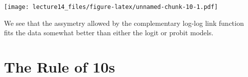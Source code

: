 \documentclass[
]{article}
\begin{document}
\texttt{[image: lecture14\_files/figure-latex/unnamed-chunk-10-1.pdf]}

We see that the assymetry allowed by the complementary log-log link
function fits the data somewhat better than either the logit or probit
models.

\hypertarget{the-rule-of-10s}{%
\section{The Rule of 10s}\label{the-rule-of-10s}}
\end{document}
